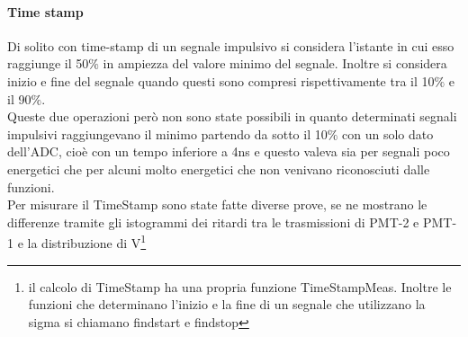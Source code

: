\documentclass[a4paper]{article}
\begin{document}
\paragraph{Time stamp}
Di solito con time-stamp di un segnale impulsivo si considera l'istante in cui esso raggiunge il 50$\%$ in ampiezza del valore minimo del segnale. Inoltre si considera inizio e fine del segnale quando questi sono compresi rispettivamente tra il 10$\%$ e il 90$\%$.\\
Queste due operazioni però non sono state possibili in quanto determinati segnali impulsivi raggiungevano il minimo partendo da sotto il 10$\%$ con un solo dato dell'ADC, cioè con un tempo inferiore a 4ns e questo valeva sia per segnali poco energetici che per alcuni molto energetici che non venivano riconosciuti dalle funzioni.\\
Per misurare il TimeStamp sono state fatte diverse prove, se ne mostrano le differenze tramite gli istogrammi dei ritardi tra le trasmissioni di PMT-2 e PMT-1 e la distribuzione di V\footnote{il calcolo di TimeStamp ha una propria funzione TimeStampMeas. Inoltre le funzioni che determinano l'inizio e la fine di un segnale che utilizzano la sigma si chiamano findstart e findstop}
\end{document}
